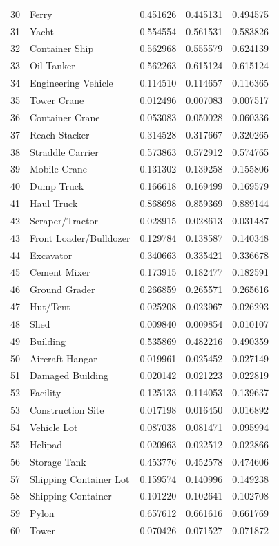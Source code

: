 \begin{center}
\begin{longtable}{|c|l|c|c|c|}
30 & Ferry & 0.451626 & 0.445131 & 0.494575\\
31 & Yacht & 0.554554 & 0.561531 & 0.583826\\
32 & Container Ship & 0.562968 & 0.555579 & 0.624139\\
33 & Oil Tanker & 0.562263 & 0.615124 & 0.615124\\
34 & Engineering Vehicle & 0.114510 & 0.114657 & 0.116365\\
35 & Tower Crane & 0.012496 & 0.007083 & 0.007517\\
36 & Container Crane & 0.053083 & 0.050028 & 0.060336\\
37 & Reach Stacker & 0.314528 & 0.317667 & 0.320265\\
38 & Straddle Carrier & 0.573863 & 0.572912 & 0.574765\\
39 & Mobile Crane & 0.131302 & 0.139258 & 0.155806\\
40 & Dump Truck & 0.166618 & 0.169499 & 0.169579\\
41 & Haul Truck & 0.868698 & 0.859369 & 0.889144\\
42 & Scraper/Tractor & 0.028915 & 0.028613 & 0.031487\\
43 & Front Loader/Bulldozer & 0.129784 & 0.138587 & 0.140348\\
44 & Excavator & 0.340663 & 0.335421 & 0.336678\\
45 & Cement Mixer & 0.173915 & 0.182477 & 0.182591\\
46 & Ground Grader & 0.266859 & 0.265571 & 0.265616\\
47 & Hut/Tent & 0.025208 & 0.023967 & 0.026293\\
48 & Shed & 0.009840 & 0.009854 & 0.010107\\
49 & Building & 0.535869 & 0.482216 & 0.490359\\
50 & Aircraft Hangar & 0.019961 & 0.025452 & 0.027149\\
51 & Damaged Building & 0.020142 & 0.021223 & 0.022819\\
52 & Facility & 0.125133 & 0.114053 & 0.139637\\
53 & Construction Site & 0.017198 & 0.016450 & 0.016892\\
54 & Vehicle Lot & 0.087038 & 0.081471 & 0.095994\\
55 & Helipad & 0.020963 & 0.022512 & 0.022866\\
56 & Storage Tank & 0.453776 & 0.452578 & 0.474606\\
57 & Shipping Container Lot & 0.159574 & 0.140996 & 0.149238\\
58 & Shipping Container & 0.101220 & 0.102641 & 0.102708\\
59 & Pylon & 0.657612 & 0.661616 & 0.661769\\
60 & Tower & 0.070426 & 0.071527 & 0.071872\\
\end{longtable}
\end{center}

